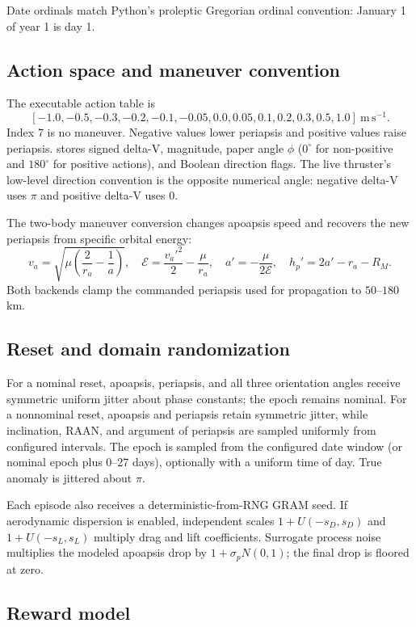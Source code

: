 \documentclass[11pt]{article}
\newcommand{\code}[1]{\texttt{\detokenize{#1}}}
\newcommand{\unit}[1]{\ensuremath{\mathrm{#1}}}
\begin{document}
Date ordinals match Python's proleptic Gregorian ordinal convention:
January 1 of year 1 is day 1.

\subsection{Action space and maneuver convention}

The executable action table is
\[
[-1.0,-0.5,-0.3,-0.2,-0.1,-0.05,0.0,
  0.05,0.1,0.2,0.3,0.5,1.0]\ \unit{m\,s^{-1}}.
\]
Index 7 is no maneuver.  Negative values lower periapsis and positive values
raise periapsis.  \code{AerobrakingAction} stores signed delta-V, magnitude,
paper angle $\phi$ ($0^\circ$ for non-positive and $180^\circ$ for positive
actions), and Boolean direction flags.  The live thruster's low-level
direction convention is the opposite numerical angle: negative delta-V uses
$\pi$ and positive delta-V uses $0$.

The two-body maneuver conversion changes apoapsis speed and recovers the new
periapsis from specific orbital energy:
\[
 v_a=\sqrt{\mu\left(\frac{2}{r_a}-\frac{1}{a}\right)},\quad
 \mathcal{E}=\frac{v_a'^2}{2}-\frac{\mu}{r_a},\quad
 a'=-\frac{\mu}{2\mathcal{E}},\quad
 h_p'=2a'-r_a-R_M.
\]
Both backends clamp the commanded periapsis used for propagation to
$50$--$180$ km.

\subsection{Reset and domain randomization}

For a nominal reset, apoapsis, periapsis, and all three orientation angles
receive symmetric uniform jitter about phase constants; the epoch remains
nominal.  For a nonnominal reset, apoapsis and periapsis retain symmetric
jitter, while inclination, RAAN, and argument of periapsis are sampled
uniformly from configured intervals.  The epoch is sampled from the
configured date window (or nominal epoch plus 0--27 days), optionally with a
uniform time of day.  True anomaly is jittered about $\pi$.

Each episode also receives a deterministic-from-RNG GRAM seed.  If
aerodynamic dispersion is enabled, independent scales
$1+U(-s_D,s_D)$ and $1+U(-s_L,s_L)$ multiply drag and lift coefficients.
Surrogate process noise multiplies the modeled apoapsis drop by
$1+\sigma_p N(0,1)$; the final drop is floored at zero.

\subsection{Reward model}
\end{document}
